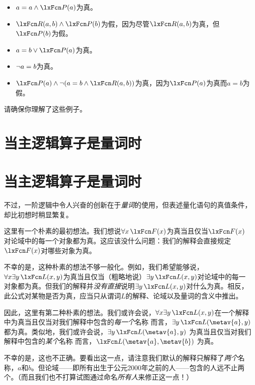 \begin{itemize}
		\item$a = a \eand \atom{P}{a}$为真。
		\item$\atom{R}{a,b} \eand \atom{P}{b}$为假，因为尽管$\atom{R}{a,b}$为真，但$\atom{P}{b}$为假。
		\item$a = b \eor \atom{P}{a}$为真。
		\item$\neg a = b$为真。
		\item$\atom{P}{a} \eand \enot( a= b \eand \atom{R}{a,b})$为真，因为$\atom{P}{a}$为真而$a = b$为假。
	\end{itemize}


请确保你理解了这些例子。

\ifHTMLtarget
\section{当主逻辑算子是量词时}
\else
\section[Quantifiers]{当主逻辑算子是量词时}
\fi
\label{s:MainLogicalOperatorQuantifier}

不过，一阶逻辑中令人兴奋的创新在于\emph{量词}的使用，但表述量化语句的真值条件，却比初想时稍显繁复。

这里有一个朴素的最初想法。我们想说$\forall x\, \atom{F}{x}$为真当且仅当$\atom{F}{x}$对论域中的每一个对象都为真。这应该没什么问题：我们的解释会直接规定$\atom{F}{x}$对哪些对象为真。

不幸的是，这种朴素的想法不够一般化。例如，我们希望能够说，$\forall x \exists y\, \atom{L}{x,y}$为真当且仅当（粗略地说）$\exists y\, \atom{L}{x,y}$对论域中的每一对象都为真。但我们的解释并\emph{没有直接}说明$\exists y\, \atom{L}{x,y}$对什么为真。相反，此公式对某物是否为真，应当只从谓词$L$的解释、论域以及量词的含义中推出。

因此，这里有第二种朴素的想法。我们或许会说，$\forall x \exists y\, \atom{L}{x,y}$在一个解释中为真当且仅当对我们解释中包含的\emph{每一个}名称  而言，$\exists y\, \atom{L}{\metav{a},y}$ 都为真。类似地，我们或许会说，$\exists y\, \atom{L}{\metav{a},y}$ 为真当且仅当对我们解释中包含的\emph{某个}名称  而言，$\atom{L}{\metav{a},\metav{b}}$ 为真。

不幸的是，这也不正确。要看出这一点，请注意我们默认的解释只解释了\emph{两个}名称，$a$和$b$。但论域——即所有出生于公元2000年之前的人——包含的人远不止两个。（而且我们也不打算试图通过命名\emph{所有人}来修正这一点！）

